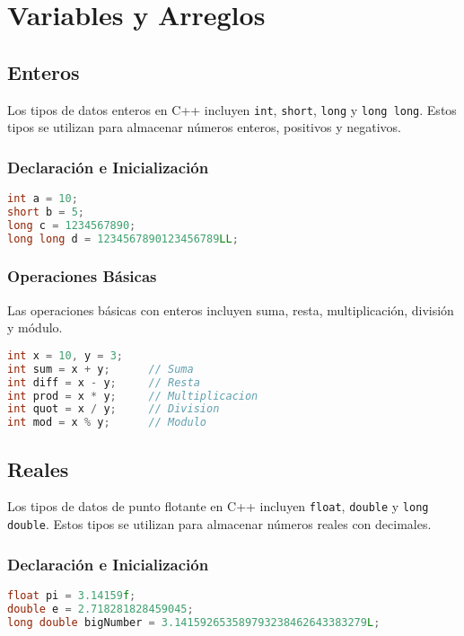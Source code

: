 \section{Variables y Arreglos}

\subsection{Enteros}

Los tipos de datos enteros en C++ incluyen \texttt{int}, \texttt{short}, \texttt{long} y \texttt{long long}. Estos tipos se utilizan para almacenar números enteros, positivos y negativos.

\subsubsection{Declaración e Inicialización}

\begin{lstlisting}[language=C++]
int a = 10;
short b = 5;
long c = 1234567890;
long long d = 1234567890123456789LL;
\end{lstlisting}

\subsubsection{Operaciones Básicas}

Las operaciones básicas con enteros incluyen suma, resta, multiplicación, división y módulo.

\begin{lstlisting}[language=C++]
int x = 10, y = 3;
int sum = x + y;      // Suma
int diff = x - y;     // Resta
int prod = x * y;     // Multiplicacion
int quot = x / y;     // Division
int mod = x % y;      // Modulo
\end{lstlisting}

\subsection{Reales}

Los tipos de datos de punto flotante en C++ incluyen \texttt{float}, \texttt{double} y \texttt{long double}. Estos tipos se utilizan para almacenar números reales con decimales.

\subsubsection{Declaración e Inicialización}

\begin{lstlisting}[language=C++]
float pi = 3.14159f;
double e = 2.718281828459045;
long double bigNumber = 3.141592653589793238462643383279L;
\end{lstlisting}

